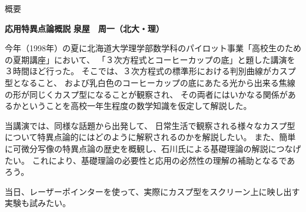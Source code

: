 \documentclass[uplatex,dvipdfmx]{jlreq}
\begin{document}
\begin{center}
  {\large 概要}
\end{center}

\vspace{20pt}

\noindent
{\large\bfseries 応用特異点論概説}
\hfill
{\large\bfseries 泉屋　周一（北大・理）}

\medskip

今年（1998年）の夏に北海道大学理学部数学科のパイロット事業「高校生のための夏期講座」において、
「３次方程式とコーヒーカップの底」と題した講演を３時間ほど行った。
そこでは、３次方程式の標準形における判別曲線がカスプ型となること、
および乳白色のコーヒーカップの底にあたる光から出来る焦線の形が同じくカスプ型になることが観察され、
その両者にはいかなる関係があるかということを高校一年生程度の数学知識を仮定して解説した。

当講演では、同様な話題から出発して、
日常生活で観察される様々なカスプ型について特異点論的にはどのように解釈されるのかを解説したい。
また、簡単に可微分写像の特異点論の歴史を概観し、石川氏による基礎理論の解説につなげたい。
これにより、基礎理論の必要性と応用の必然性の理解の補助となるであろう。

当日、レーザーポインターを使って、実際にカスプ型をスクリーン上に映し出す実験も試みたい。
\end{document}

